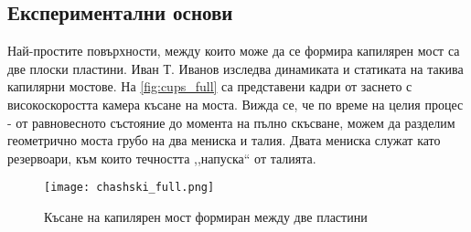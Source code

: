\subsection{Експериментални основи}
Най-простите повърхности, между които може да се формира капилярен мост са две плоски пластини.
Иван Т. Иванов \cite{ivan_phd} изследва динамиката и статиката на такива капилярни мостове.
На \autoref{fig:cups_full} са представени кадри от заснето с високоскоростта камера късане на моста.
Вижда се, че по време на целия процес - от равновесното състояние до момента на пълно скъсване, можем
да разделим геометрично моста грубо на два мениска и талия. Двата мениска служат като резервоари, към които
течността ,,напуска`` от талията. 
\begin{figure*}[h]
    \centering
    \texttt{[image: chashski\_full.png]}
    \caption{Късане на капилярен мост формиран между две пластини \cite{ivan_phd}}
    \label{fig:cups_full}
\end{figure*}
